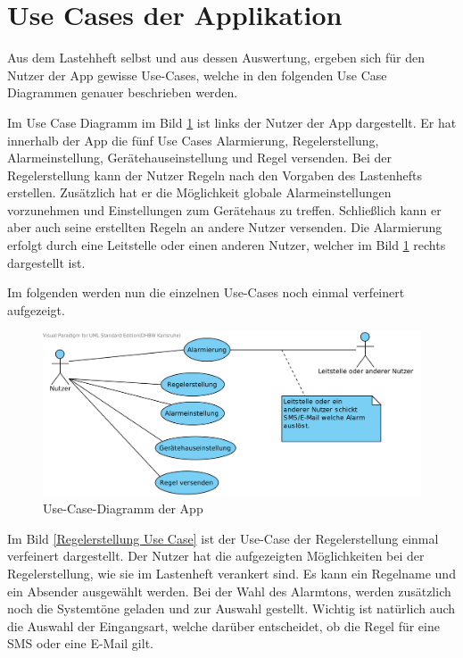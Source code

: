 \section{Use Cases der Applikation}
\label{Use Case Diagramme}
Aus dem Lastehheft selbst und aus dessen Auswertung, ergeben sich f\"ur den Nutzer der App gewisse Use-Cases, welche in den folgenden Use Case Diagrammen genauer beschrieben werden.

Im Use Case Diagramm im Bild \ref{Main Use Case} ist links der Nutzer der App dargestellt. Er hat innerhalb der App die f\"unf Use Cases Alarmierung, Regelerstellung, Alarmeinstellung, Ger\"atehauseinstellung und Regel versenden. Bei der Regelerstellung kann der Nutzer Regeln nach den Vorgaben des Lastenhefts erstellen. Zus\"atzlich hat er die M\"oglichkeit globale Alarmeinstellungen vorzunehmen und Einstellungen zum Ger\"atehaus zu treffen. Schlie\ss{}lich kann er aber auch seine erstellten Regeln an andere Nutzer versenden. 
Die Alarmierung erfolgt durch eine Leitstelle oder einen anderen Nutzer, welcher im Bild \ref{Main Use Case} rechts dargestellt ist.

Im folgenden werden nun die einzelnen Use-Cases noch einmal verfeinert aufgezeigt.
\begin{figure}[!ht]
\centering
\includegraphics[width=16cm]{Bilder/AlarmSMS_App.png}
\caption{Use-Case-Diagramm der App}
\label{Main Use Case}
\centering
\end{figure}

Im Bild \ref{Regelerstellung Use Case} ist der Use-Case der Regelerstellung einmal verfeinert dargestellt. Der Nutzer hat die aufgezeigten M\"oglichkeiten bei der Regelerstellung, wie sie im Lastenheft verankert sind. Es kann ein Regelname und ein Absender ausgew\"ahlt werden. Bei der Wahl des Alarmtons, werden zus\"atzlich noch die Systemt\"one geladen und zur Auswahl gestellt. Wichtig ist nat\"urlich auch die Auswahl der Eingangsart, welche dar\"uber entscheidet, ob die Regel f\"ur eine SMS oder eine E-Mail gilt. 

